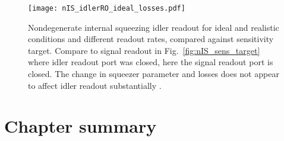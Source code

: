\begin{figure}
	\centering
	\texttt{[image: nIS\_idlerRO\_ideal\_losses.pdf]}
	\caption{  Nondegenerate internal squeezing idler readout for ideal and realistic conditions and different readout rates, compared against sensitivity target. Compare to signal readout in Fig.~\ref{fig:nIS_sens_target} where idler readout port was closed, here the signal readout port is closed. The change in squeezer parameter and losses does not appear to affect idler readout substantially . }
	\label{fig:}
\end{figure}








\section{Chapter summary}






